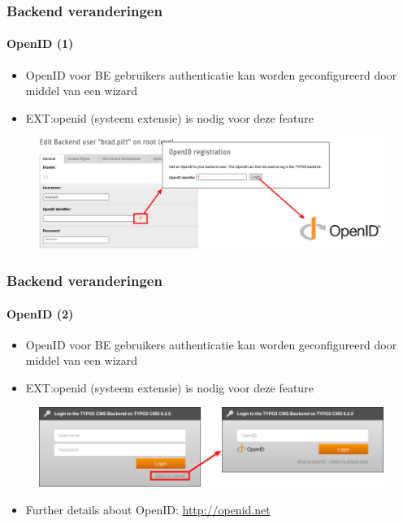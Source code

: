 
\begin{frame}[fragile]
	\frametitle{Backend veranderingen}
	\framesubtitle{OpenID (1)}

 	\begin{itemize}
		\item OpenID voor BE gebruikers authenticatie kan worden \newline 
		geconfigureerd door middel van een wizard
		\item EXT:openid (systeem extensie) is nodig voor deze feature
	\end{itemize}

	\begin{figure}
		\includegraphics[width=0.95\linewidth]{Images/BackendChanges/OpenIdWizard.png}
	\end{figure}

\end{frame}


\begin{frame}[fragile]
	\frametitle{Backend veranderingen}
	\framesubtitle{OpenID (2)}

 	\begin{itemize}
		\item OpenID voor BE gebruikers authenticatie kan worden \newline 
		geconfigureerd door middel van een wizard
		\item EXT:openid (systeem extensie) is nodig voor deze feature
	\end{itemize}

	\begin{figure}
		\includegraphics[width=0.8\linewidth]{Images/BackendChanges/OpenIdLogin.png}
	\end{figure}

 	\begin{itemize}
		\item Further details about OpenID:\newline
			\small\url{http://openid.net}\normalsize
	\end{itemize}

\end{frame}

